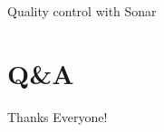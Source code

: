 \documentclass[pdf]{beamer}
\begin{document}
\begin{frame}{Quality control with Sonar}
\end{frame}

\section{Q\&A}

\begin{frame}{Thanks Everyone!}
\end{frame}
%
%
%
%
%
%    
%
%
%
\end{document}
